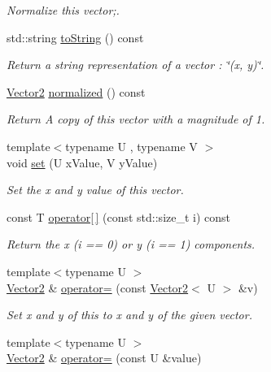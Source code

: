 \begin{DoxyCompactItemize}
\begin{DoxyCompactList}\small\item\em Normalize this vector;. \end{DoxyCompactList}\item 
std\+::string \hyperlink{classfuzzy_telegram_1_1_vector2_ada37aeefbcdec3a732dd7d93fa82ca7f}{to\+String} () const 
\begin{DoxyCompactList}\small\item\em Return a string representation of a vector \+: \char`\"{}(x, y)\char`\"{}. \end{DoxyCompactList}\item 
\hyperlink{classfuzzy_telegram_1_1_vector2}{Vector2} \hyperlink{classfuzzy_telegram_1_1_vector2_af54abf8502462326ae7765f79f01161b}{normalized} () const 
\begin{DoxyCompactList}\small\item\em Return A copy of this vector with a magnitude of 1. \end{DoxyCompactList}\item 
{\footnotesize template$<$typename U , typename V $>$ }\\void \hyperlink{classfuzzy_telegram_1_1_vector2_a02eb86e3b78dda269af45c01d488dfb5}{set} (U x\+Value, V y\+Value)
\begin{DoxyCompactList}\small\item\em Set the x and y value of this vector. \end{DoxyCompactList}\item 
const T \hyperlink{classfuzzy_telegram_1_1_vector2_a132d78d0f26155006d88c1c06248e5ac}{operator\mbox{[}$\,$\mbox{]}} (const std\+::size\+\_\+t i) const 
\begin{DoxyCompactList}\small\item\em Return the x (i == 0) or y (i == 1) components. \end{DoxyCompactList}\item 
{\footnotesize template$<$typename U $>$ }\\\hyperlink{classfuzzy_telegram_1_1_vector2}{Vector2} \& \hyperlink{classfuzzy_telegram_1_1_vector2_a49d6c0bf180b3ad73571a2d782eda77c}{operator=} (const \hyperlink{classfuzzy_telegram_1_1_vector2}{Vector2}$<$ U $>$ \&v)
\begin{DoxyCompactList}\small\item\em Set x and y of this to x and y of the given vector. \end{DoxyCompactList}\item 
{\footnotesize template$<$typename U $>$ }\\\hyperlink{classfuzzy_telegram_1_1_vector2}{Vector2} \& \hyperlink{classfuzzy_telegram_1_1_vector2_aac69bf7151626c5c15783274aa2cf9e7}{operator=} (const U \&value)

\end{DoxyCompactItemize}
